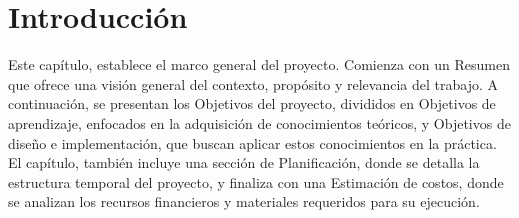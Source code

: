 \chapter{Introducción}

Este capítulo, establece el marco general del proyecto. Comienza con un Resumen que ofrece una visión general del contexto, propósito y relevancia del trabajo. A continuación, se presentan los Objetivos del proyecto, divididos en Objetivos de aprendizaje, enfocados en la adquisición de conocimientos teóricos, y Objetivos de diseño e implementación, que buscan aplicar estos conocimientos en la práctica. El capítulo, también incluye una sección de Planificación, donde se detalla la estructura temporal del proyecto, y finaliza con una Estimación de costos, donde se analizan los recursos financieros y materiales requeridos para su ejecución.

